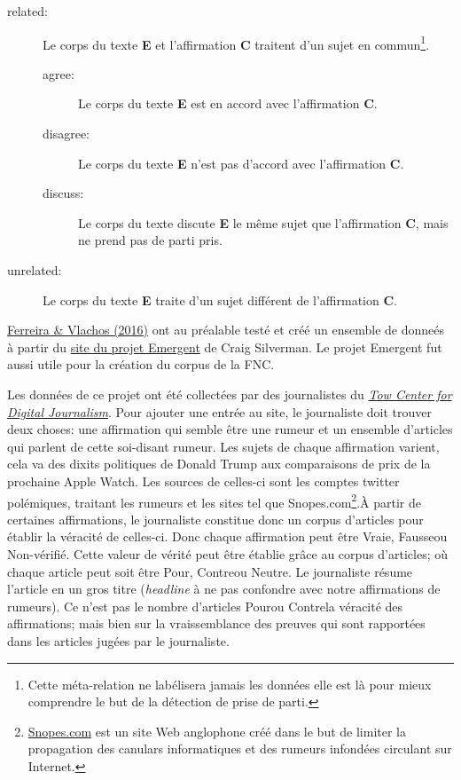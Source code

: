 \documentclass[onecolumn, 12pt]{article}
\begin{document}
\begin{description}
 \item [related:] Le corps du texte \textbf{E} et l'affirmation \textbf{C} traitent d'un sujet en commun\footnote{Cette méta-relation ne labélisera jamais les données elle est là pour mieux comprendre le but de la détection de prise de parti.}.
 \begin{description}
  \item [agree:] Le corps du texte \textbf{E} est en accord avec l'affirmation \textbf{C}.
  \item [disagree:] Le corps du texte \textbf{E} n'est pas d'accord avec l'affirmation \textbf{C}.
  \item [discuss:] Le corps du texte discute \textbf{E} le même sujet que l'affirmation \textbf{C}, mais ne prend pas de parti pris.
 \end{description}
 \item [unrelated:] Le corps du texte \textbf{E} traite d'un sujet différent de l'affirmation \textbf{C}.
\end{description}

\href{http://aclweb.org/anthology/N/N16/N16-1138.pdf}{Ferreira \& Vlachos (2016)} ont au préalable testé et créé un ensemble de donneés à partir du \href{http://www.emergent.info/}{site du projet Emergent} de Craig Silverman.
Le projet Emergent fut aussi utile pour la création du corpus de la FNC.

Les données de ce projet ont été collectées par des journalistes du \href{https://towcenter.org/}{\textit{Tow Center for Digital Journalism}}.
Pour ajouter une entrée au site, le journaliste doit trouver deux choses: une affirmation qui semble être une rumeur et un ensemble d'articles qui parlent de cette soi-disant rumeur.
Les sujets de chaque affirmation varient, cela va des dixits politiques de Donald Trump aux comparaisons de prix de la prochaine Apple Watch.
Les sources de celles-ci sont les comptes twitter polémiques, traitant les rumeurs et les sites tel que Snopes.com\footnote{\href{https://www.snopes.com/}{Snopes.com} est un site Web anglophone créé dans le but de limiter la propagation des canulars informatiques et des rumeurs infondées circulant sur Internet.}.À partir de certaines affirmations, le journaliste constitue donc un corpus d'articles pour établir la véracité de celles-ci.
Donc chaque affirmation peut être \og Vraie\fg, \og Fausse\fg ou \og Non-vérifié\fg.
Cette valeur de vérité peut être établie grâce au corpus d'articles; où chaque article peut soit être \og Pour\fg, \og Contre\fg ou \og Neutre\fg.
Le journaliste résume l'article en un gros titre (\textit{headline} à ne pas confondre avec notre affirmations de rumeurs).
Ce n'est pas le nombre d'articles \og Pour\fg  ou \og Contre\fg la véracité des affirmations; mais bien sur la vraissemblance des preuves qui sont rapportées dans les articles jugées par le journaliste.
\end{document}
